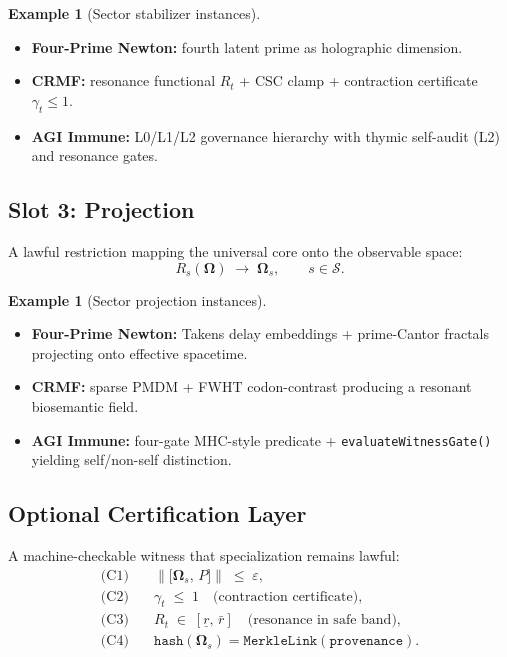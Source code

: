 \documentclass[12pt,a4paper]{article}
\theoremstyle{plain}
\theoremstyle{definition}
\newtheorem{example}[theorem]{Example}
\theoremstyle{remark}
\newcommand{\norm}[1]{\left\lVert #1 \right\rVert}
\newcommand{\eps}{\varepsilon}
\begin{document}
\begin{example}[Sector stabilizer instances]\hfill
\begin{itemize}
  \item \textbf{Four-Prime Newton:} fourth latent prime as holographic
        dimension.
  \item \textbf{CRMF:} resonance functional $R_t$ + CSC clamp +
        contraction certificate $\gamma_t \le 1$.
  \item \textbf{AGI Immune:} L0/L1/L2 governance hierarchy with thymic
        self-audit (L2) and resonance gates.
\end{itemize}
\end{example}

\subsection{Slot 3: Projection}
\label{sec:projection}

A lawful restriction mapping the universal core onto the observable space:
\begin{equation}
  R_s(\boldsymbol{\Omega}) \;\longrightarrow\; \boldsymbol{\Omega}_s,
  \qquad s \in \mathcal{S}.
  \label{eq:projection}
\end{equation}

\begin{example}[Sector projection instances]\hfill
\begin{itemize}
  \item \textbf{Four-Prime Newton:} Takens delay embeddings + prime-Cantor
        fractals projecting onto effective spacetime.
  \item \textbf{CRMF:} sparse PMDM + FWHT codon-contrast producing
        a resonant biosemantic field.
  \item \textbf{AGI Immune:} four-gate MHC-style predicate +
        \texttt{evaluateWitnessGate()} yielding self/non-self distinction.
\end{itemize}
\end{example}

\subsection{Optional Certification Layer}
\label{sec:cert-layer}

A machine-checkable witness that specialization remains lawful:
\begin{align}
  \text{(C1)}&\quad \norm{\bigl[\boldsymbol{\Omega}_s,\, P\bigr]} \;\le\; \eps,
  \label{eq:c1}\\[4pt]
  \text{(C2)}&\quad \gamma_t \;\le\; 1 \quad \text{(contraction certificate)},
  \label{eq:c2}\\[4pt]
  \text{(C3)}&\quad R_t \;\in\; [\underline{r},\, \bar{r}] \quad
               \text{(resonance in safe band)},
  \label{eq:c3}\\[4pt]
  \text{(C4)}&\quad \mathtt{hash}(\boldsymbol{\Omega}_s)
               = \mathtt{MerkleLink}(\mathtt{provenance}).
  \label{eq:c4}
\end{align}
\end{document}
